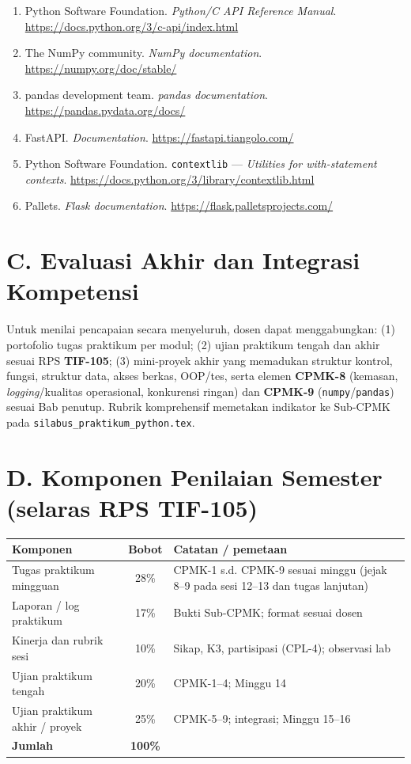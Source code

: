 \begin{enumerate}[leftmargin=*]
  \item Python Software Foundation. \textit{Python/C API Reference Manual}. \url{https://docs.python.org/3/c-api/index.html}
  \item The NumPy community. \textit{NumPy documentation}. \url{https://numpy.org/doc/stable/}
  \item pandas development team. \textit{pandas documentation}. \url{https://pandas.pydata.org/docs/}
  \item FastAPI. \textit{Documentation}. \url{https://fastapi.tiangolo.com/}
  \item Python Software Foundation. \texttt{contextlib} --- \textit{Utilities for with-statement contexts}. \url{https://docs.python.org/3/library/contextlib.html}
  \item Pallets. \textit{Flask documentation}. \url{https://flask.palletsprojects.com/}
\end{enumerate}

\section*{C. Evaluasi Akhir dan Integrasi Kompetensi}

Untuk menilai pencapaian secara menyeluruh, dosen dapat menggabungkan: (1) portofolio tugas praktikum per modul; (2) ujian praktikum tengah dan akhir sesuai RPS \textbf{TIF-105}; (3) mini-proyek akhir yang memadukan struktur kontrol, fungsi, struktur data, akses berkas, OOP/tes, serta elemen \textbf{CPMK-8} (kemasan, \textit{logging}/kualitas operasional, konkurensi ringan) dan \textbf{CPMK-9} (\texttt{numpy}/\texttt{pandas}) sesuai Bab penutup. Rubrik komprehensif memetakan indikator ke Sub-CPMK pada \texttt{silabus\_praktikum\_python.tex}.

\section*{D. Komponen Penilaian Semester (selaras RPS TIF-105)}

\begin{center}
\begin{tabular}{|l|c|p{7cm}|}
\hline
\textbf{Komponen} & \textbf{Bobot} & \textbf{Catatan / pemetaan} \\
\hline
Tugas praktikum mingguan & 28\% & CPMK-1 s.d. CPMK-9 sesuai minggu (jejak 8--9 pada sesi 12--13 dan tugas lanjutan) \\
\hline
Laporan / log praktikum & 17\% & Bukti Sub-CPMK; format sesuai dosen \\
\hline
Kinerja dan rubrik sesi & 10\% & Sikap, K3, partisipasi (CPL-4); observasi lab \\
\hline
Ujian praktikum tengah & 20\% & CPMK-1--4; Minggu 14 \\
\hline
Ujian praktikum akhir / proyek & 25\% & CPMK-5--9; integrasi; Minggu 15--16 \\
\hline
\textbf{Jumlah} & \textbf{100\%} & \\
\hline
\end{tabular}
\end{center}

